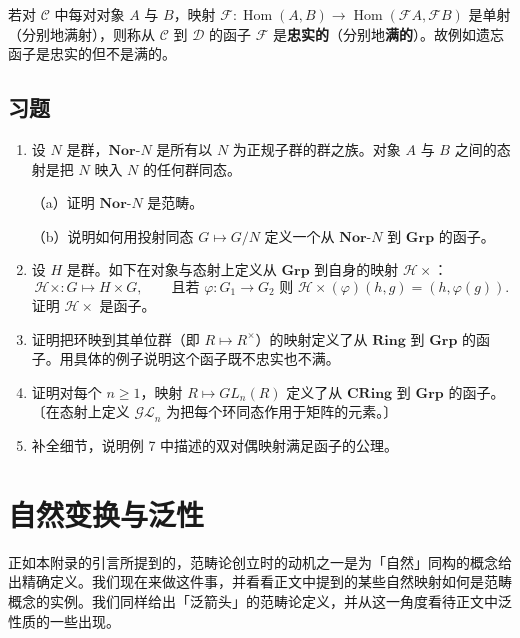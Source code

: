 若对 \(\mathcal{C}\) 中每对对象 \(A\) 与 \(B\)，映射 \(\mathcal{F} : \operatorname{Hom}(A, B) \to \operatorname{Hom}(\mathcal{F}A, \mathcal{F}B)\) 是单射（分别地满射），则称从 \(\mathcal{C}\) 到 \(\mathcal{D}\) 的函子 \(\mathcal{F}\) 是\textbf{忠实的}（分别地\textbf{满的}）。故例如遗忘函子是忠实的但不是满的。

\subsection*{习题}

\begin{enumerate}
\item 设 \(N\) 是群，\(\mathbf{Nor}\text{-}N\) 是所有以 \(N\) 为正规子群的群之族。对象 \(A\) 与 \(B\) 之间的态射是把 \(N\) 映入 \(N\) 的任何群同态。

（a）证明 \(\mathbf{Nor}\text{-}N\) 是范畴。

（b）说明如何用投射同态 \(G \mapsto G/N\) 定义一个从 \(\mathbf{Nor}\text{-}N\) 到 \(\mathbf{Grp}\) 的函子。

\item 设 \(H\) 是群。如下在对象与态射上定义从 \(\mathbf{Grp}\) 到自身的映射 \(\mathcal{H}\times\)：
\[
\mathcal{H}\times : G \mapsto H \times G, \qquad \text{且若 } \varphi : G_1 \to G_2 \text{ 则 } \mathcal{H}\times(\varphi)(h, g) = (h, \varphi(g)).
\]
证明 \(\mathcal{H}\times\) 是函子。

\item 证明把环映到其单位群（即 \(R \mapsto R^\times\)）的映射定义了从 \(\mathbf{Ring}\) 到 \(\mathbf{Grp}\) 的函子。用具体的例子说明这个函子既不忠实也不满。

\item 证明对每个 \(n \geq 1\)，映射 \(R \mapsto GL_n(R)\) 定义了从 \(\mathbf{CRing}\) 到 \(\mathbf{Grp}\) 的函子。〔在态射上定义 \(\mathcal{GL}_n\) 为把每个环同态作用于矩阵的元素。〕

\item 补全细节，说明例 7 中描述的双对偶映射满足函子的公理。
\end{enumerate}

\section{自然变换与泛性}

正如本附录的引言所提到的，范畴论创立时的动机之一是为「自然」同构的概念给出精确定义。我们现在来做这件事，并看看正文中提到的某些自然映射如何是范畴概念的实例。我们同样给出「泛箭头」的范畴论定义，并从这一角度看待正文中泛性质的一些出现。

